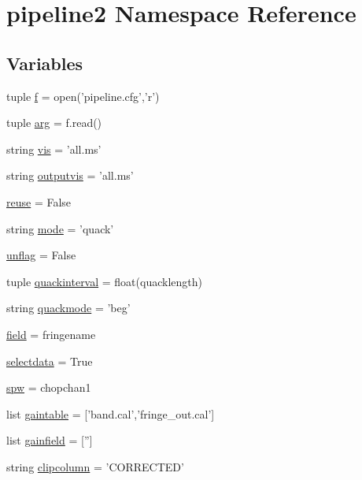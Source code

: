 \hypertarget{namespacepipeline2}{\section{pipeline2 \-Namespace \-Reference}
\label{namespacepipeline2}
}
\subsection*{\-Variables}
\begin{DoxyCompactItemize}
\item 
tuple \hyperlink{namespacepipeline2_a6b1a836bf4ef6f77f89cf996d1441378}{f} = open('pipeline.\-cfg','r')
\item 
tuple \hyperlink{namespacepipeline2_af38c12281c772d37cb9a08a6fbbe0245}{arg} = f.\-read()
\item 
string \hyperlink{namespacepipeline2_ae3be805ec48840f7fafb8ad4ced22091}{vis} = 'all.\-ms'
\item 
string \hyperlink{namespacepipeline2_aee0f088648acf71251824b2f6ecc7782}{outputvis} = 'all.\-ms'
\item 
\hyperlink{namespacepipeline2_a1e993f36d3fc958f5a1af7e539962f52}{reuse} = \-False
\item 
string \hyperlink{namespacepipeline2_a64dbb436e00eaaf809aca44a0584bceb}{mode} = 'quack'
\item 
\hyperlink{namespacepipeline2_a0b364022d60380ca77b054f075d652af}{unflag} = \-False
\item 
tuple \hyperlink{namespacepipeline2_a93c2f9801b34cbceec33031b6ba03699}{quackinterval} = float(quacklength)
\item 
string \hyperlink{namespacepipeline2_a129fb733ea70148d293b8b4ac5b760e3}{quackmode} = 'beg'
\item 
\hyperlink{namespacepipeline2_aa8e85b4cb202f0b59a2563d6c2a6e345}{field} = fringename
\item 
\hyperlink{namespacepipeline2_a141794e6e70ea02fd79048d23af0355b}{selectdata} = \-True
\item 
\hyperlink{namespacepipeline2_a02dbafd807aa40dac62101bee4dfd6f1}{spw} = chopchan1
\item 
list \hyperlink{namespacepipeline2_a433a42f72e521b82226be074a8d1b20e}{gaintable} = \mbox{[}'band.\-cal','fringe\-\_\-out.\-cal'\mbox{]}
\item 
list \hyperlink{namespacepipeline2_adad67970585fa9911fceaa757e0f4a91}{gainfield} = \mbox{[}''\mbox{]}
\item 
string \hyperlink{namespacepipeline2_aed76e7c47bf36e722f0f7caf34838a53}{clipcolumn} = '\-C\-O\-R\-R\-E\-C\-T\-E\-D'

\end{DoxyCompactItemize}
